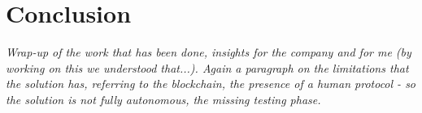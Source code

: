 \chapter{Conclusion}
\label{cha:conclusion}
\textit{Wrap-up of the work that has been done, insights for the company and for me (by working on this we understood that...). Again a paragraph on the limitations that the solution has, referring to the blockchain, the presence of a human protocol - so the solution is not fully autonomous, the missing testing phase. }

